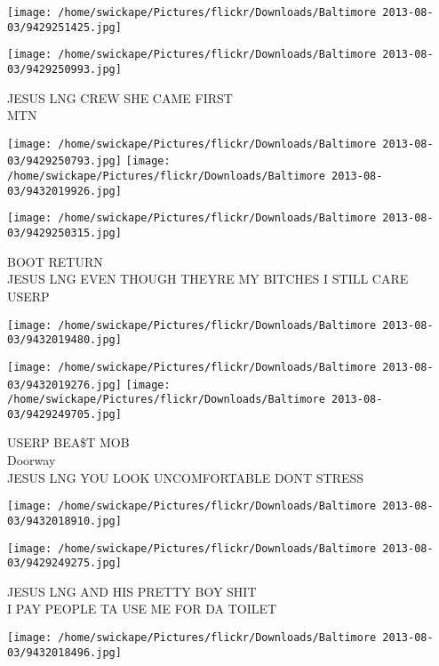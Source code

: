 \documentclass[10pt,letterpaper]{article}
\begin{document}
\texttt{[image: /home/swickape/Pictures/flickr/Downloads/Baltimore 2013-08-03/9429251425.jpg]}

\vspace{0.25in}
\texttt{[image: /home/swickape/Pictures/flickr/Downloads/Baltimore 2013-08-03/9429250993.jpg]}

JESUS LNG CREW SHE CAME FIRST\\
MTN\\
\pagebreak

\texttt{[image: /home/swickape/Pictures/flickr/Downloads/Baltimore 2013-08-03/9429250793.jpg]}
\texttt{[image: /home/swickape/Pictures/flickr/Downloads/Baltimore 2013-08-03/9432019926.jpg]}

\vspace{0.25in}
\texttt{[image: /home/swickape/Pictures/flickr/Downloads/Baltimore 2013-08-03/9429250315.jpg]}

BOOT RETURN\\
JESUS LNG EVEN THOUGH THEYRE MY BITCHES I STILL CARE\\
USERP\\
\pagebreak

\texttt{[image: /home/swickape/Pictures/flickr/Downloads/Baltimore 2013-08-03/9432019480.jpg]}

\vspace{0.25in}
\texttt{[image: /home/swickape/Pictures/flickr/Downloads/Baltimore 2013-08-03/9432019276.jpg]}
\texttt{[image: /home/swickape/Pictures/flickr/Downloads/Baltimore 2013-08-03/9429249705.jpg]}

USERP BEA\$T MOB\\
Doorway\\
JESUS LNG YOU LOOK UNCOMFORTABLE DONT STRESS\\
\pagebreak

\texttt{[image: /home/swickape/Pictures/flickr/Downloads/Baltimore 2013-08-03/9432018910.jpg]}

\vspace{0.25in}
\texttt{[image: /home/swickape/Pictures/flickr/Downloads/Baltimore 2013-08-03/9429249275.jpg]}

JESUS LNG AND HIS PRETTY BOY SHIT\\
I PAY PEOPLE TA USE ME FOR DA TOILET\\
\pagebreak

\texttt{[image: /home/swickape/Pictures/flickr/Downloads/Baltimore 2013-08-03/9432018496.jpg]}
\end{document}

